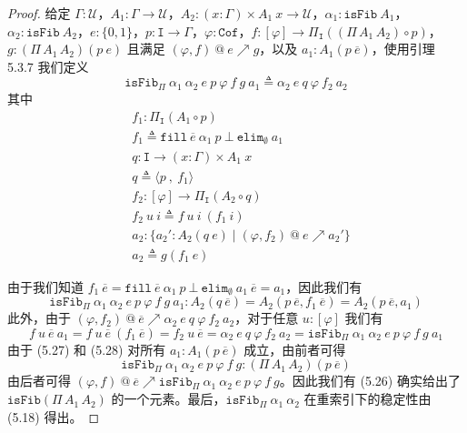 \documentclass{ctexrep}
\theoremstyle{plain}
\theoremstyle{definition}
\theoremstyle{remark}
\begin{document}
\begin{proof}
给定 $\Gamma : \mathcal{U}$，$A_1 : \Gamma \to \mathcal{U}$，$A_2 : (x : \Gamma) \times A_1\ x \to \mathcal{U}$，$\alpha_1 : \mathtt{isFib}\ A_1$，$\alpha_2 : \mathtt{isFib}\ A_2$，$e : \{0,1\}$，$p : \mathtt{I} \to \Gamma$，$\varphi : \mathtt{Cof}$，$f : [\varphi] \to \Pi_{\mathtt{I}}((\Pi\,A_1\,A_2) \circ p)$，$g : (\Pi\,A_1\,A_2)(p\ e)$ 且满足 $(\varphi, f)\ @\ e \nearrow g$，以及 $a_1 : A_1(p\ \overline{e})$，使用引理 5.3.7 我们定义
\begin{equation}
\mathtt{isFib}_\Pi\ \alpha_1\ \alpha_2\ e\ p\ \varphi\ f\ g\ a_1 \triangleq \alpha_2\ e\ q\ \varphi\ f_2\ a_2
\end{equation}
其中
\begin{align*}
&f_1 : \Pi_{\mathtt{I}}(A_1 \circ p) \\
&f_1 \triangleq \mathtt{fill}\ \overline{e}\ \alpha_1\ p\ \bot\ \mathtt{elim}_{\emptyset}\ a_1 \\
&q : \mathtt{I} \to (x : \Gamma) \times A_1\ x \\
&q \triangleq \langle p\ ,\ f_1\rangle \\
&f_2 : [\varphi] \to \Pi_{\mathtt{I}}(A_2 \circ q) \\
&f_2\ u\ i \triangleq f\ u\ i\ (f_1\ i) \\
&a_2 : \{a_2' : A_2(q\ e) \mid (\varphi, f_2)\ @\ e \nearrow a_2'\} \\
&a_2 \triangleq g(f_1\ e)
\end{align*}

由于我们知道 $f_1\ \overline{e} = \mathtt{fill}\ \overline{e}\ \alpha_1\ p\ \bot\ \mathtt{elim}_{\emptyset}\ a_1\ \overline{e} = a_1$，因此我们有
\begin{equation}
\mathtt{isFib}_\Pi\ \alpha_1\ \alpha_2\ e\ p\ \varphi\ f\ g\ a_1 : A_2(q\ \overline{e}) = A_2(p\ \overline{e}, f_1\ \overline{e}) = A_2(p\ \overline{e}, a_1)
\end{equation}
此外，由于 $(\varphi, f_2)\ @\ \overline{e} \nearrow \alpha_2\ e\ q\ \varphi\ f_2\ a_2$，对于任意 $u : [\varphi]$ 我们有
\begin{equation}
f\ u\ \overline{e}\ a_1 = f\ u\ \overline{e}\ (f_1\ \overline{e}) = f_2\ u\ \overline{e} = \alpha_2\ e\ q\ \varphi\ f_2\ a_2 = \mathtt{isFib}_\Pi\ \alpha_1\ \alpha_2\ e\ p\ \varphi\ f\ g\ a_1
\end{equation}
由于 (5.27) 和 (5.28) 对所有 $a_1 : A_1(p\ \overline{e})$ 成立，由前者可得
\[
\mathtt{isFib}_\Pi\ \alpha_1\ \alpha_2\ e\ p\ \varphi\ f\ g : (\Pi\,A_1\,A_2)(p\ \overline{e})
\]
由后者可得 $(\varphi, f)\ @\ \overline{e} \nearrow \mathtt{isFib}_\Pi\ \alpha_1\ \alpha_2\ e\ p\ \varphi\ f\ g$。因此我们有 (5.26) 确实给出了 $\mathtt{isFib}(\Pi\,A_1\,A_2)$ 的一个元素。最后，$\mathtt{isFib}_\Pi\ \alpha_1\ \alpha_2$ 在重索引下的稳定性由 (5.18) 得出。
\end{proof}
\end{document}
